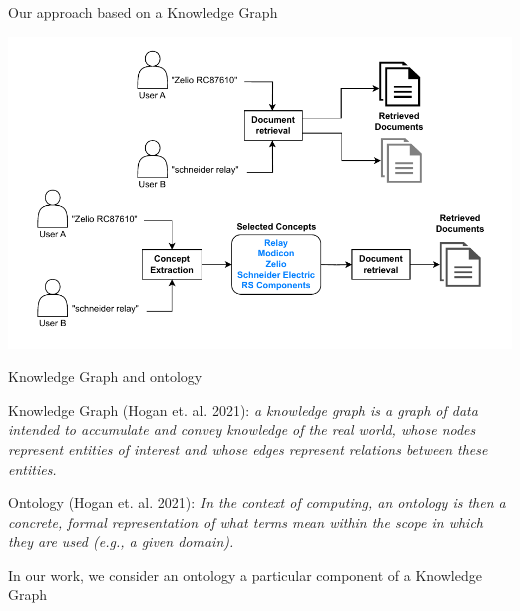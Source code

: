 \begin{frame}{Our approach based on a Knowledge Graph}

        \begin{center}
            \includegraphics[scale=0.6]{images/text-vs-concept-based-search.pdf} 
        \end{center}

\end{frame}

\begin{frame}{Knowledge Graph and ontology}

    Knowledge Graph (Hogan et. al. 2021):
    \emph{a knowledge graph is a graph of data intended to accumulate and convey knowledge of the real world, whose nodes represent entities of interest and whose edges represent relations between these entities.}
    
    Ontology (Hogan et. al. 2021):
    \emph{In the context of computing, an ontology is then a concrete, formal representation of what terms mean within the scope in which they are used (e.g., a given domain).}

    \begin{center}
        In our work, we consider an ontology a particular component of a Knowledge Graph
    \end{center}
    
\end{frame}